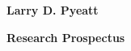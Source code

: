 \documentclass[11pt]{article}
\begin{document}
\centerline{\bf Larry D. Pyeatt}
\vspace{\baselineskip}
\centerline{\bf Research Prospectus}
\vspace{\baselineskip}

\end{document}
